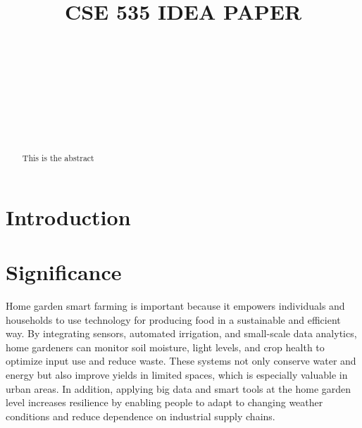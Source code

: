 \documentclass{sigchi}
\def\plaintitle{CSE 535 IDEA PAPER}
\begin{document}
\title{\plaintitle}

\author{%
  \\
  \\
  \\
  \\
  \\
  \\
    \\
}

\maketitle

\begin{abstract}
	This is the abstract
\end{abstract}

\section{Introduction}

\section{Significance}

Home garden smart farming is important because it empowers individuals and households to use technology for producing food in a sustainable and efficient way. By integrating sensors, automated irrigation, and small-scale data analytics, home gardeners can monitor soil moisture, light levels, and crop health to optimize input use and reduce waste\cite{wolfert2017big}. These systems not only conserve water and energy but also improve yields in limited spaces, which is especially valuable in urban areas. In addition, applying big data and smart tools at the home garden level increases resilience by enabling people to adapt to changing weather conditions and reduce dependence on industrial supply chains\cite{elbilali2018smart}.
\end{document}
